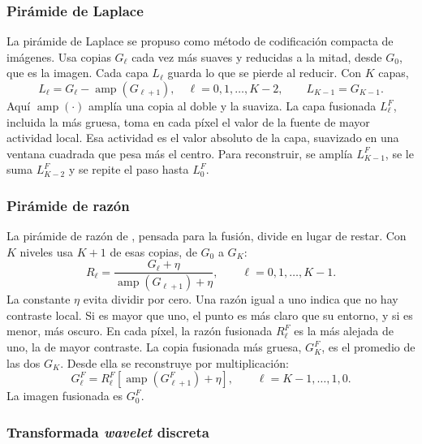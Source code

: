 \subsubsection{Pirámide de Laplace}

La pirámide de Laplace \parencite{burt1983} se propuso como método de codificación compacta de
imágenes. Usa copias $G_\ell$ cada vez más suaves y reducidas a la mitad, desde $G_0$, que es la imagen.
Cada capa $L_\ell$ guarda lo que se pierde al reducir. Con $K$ capas,
\begin{equation} L_\ell = G_\ell - \operatorname{amp}(G_{\ell+1}), \quad \ell = 0, 1, \ldots, K-2, \qquad L_{K-1} = G_{K-1}. \label{eq:laplace} \end{equation}
Aquí $\operatorname{amp}(\cdot)$ amplía una copia al doble y la suaviza. La capa fusionada $L^F_\ell$,
incluida la más gruesa, toma en cada píxel el valor de la fuente de mayor actividad local. Esa actividad
es el valor absoluto de la capa, suavizado en una ventana cuadrada que pesa más el centro. Para
reconstruir, se amplía $L^F_{K-1}$, se le suma $L^F_{K-2}$ y se repite el paso hasta $L^F_0$.

\subsubsection{Pirámide de razón}

La pirámide de razón de \textcite{toet1989}, pensada para la fusión, divide en lugar de restar. Con $K$
niveles usa $K+1$ de esas copias, de $G_0$ a $G_K$:
\begin{equation} R_\ell = \frac{G_\ell + \eta}{\operatorname{amp}(G_{\ell+1}) + \eta}, \qquad \ell = 0, 1, \ldots, K-1. \label{eq:razon} \end{equation}
La constante $\eta$ evita dividir por cero. Una razón igual a uno indica que no hay contraste local. Si
es mayor que uno, el punto es más claro que su entorno, y si es menor, más oscuro. En cada píxel, la
razón fusionada $R^F_\ell$ es la más alejada de uno, la de mayor contraste. La copia fusionada más
gruesa, $G^F_K$, es el promedio de las dos $G_K$. Desde ella se reconstruye por multiplicación:
\begin{equation} G^F_\ell = R^F_\ell \left[ \operatorname{amp}(G^F_{\ell+1}) + \eta \right], \qquad \ell = K-1, \ldots, 1, 0. \label{eq:razon-reconstruccion} \end{equation}
La imagen fusionada es $G^F_0$.

\subsubsection{Transformada \textit{wavelet} discreta}


